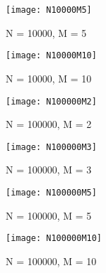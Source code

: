 \documentclass{article}
\begin{document}
\begin{figure}[h]
    \centering
    \texttt{[image: N10000M5]}
    \caption{N = 10000, M = 5}
\end{figure}

\begin{figure}[h]
    \centering
    \texttt{[image: N10000M10]}
    \caption{N = 10000, M = 10}
\end{figure}

\begin{figure}[h]
    \centering
    \texttt{[image: N100000M2]}
    \caption{N = 100000, M = 2}
\end{figure}

\begin{figure}[h]
    \centering
    \texttt{[image: N100000M3]}
    \caption{N = 100000, M = 3}
\end{figure}

\begin{figure}[h]
    \centering
    \texttt{[image: N100000M5]}
    \caption{N = 100000, M = 5}
\end{figure}

\begin{figure}[h]
    \centering
    \texttt{[image: N100000M10]}
    \caption{N = 100000, M = 10}
\end{figure}
\end{document}
